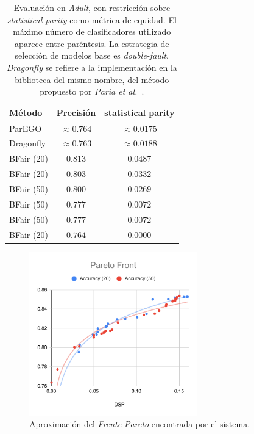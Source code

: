 \begin{table}[H]
    \centering

    \begin{tabular}{lcc}
    \toprule
        Método & Precisión & statistical parity \\
        \midrule \midrule
        ParEGO & $\approx 0.764$ & $\approx 0.0175$ \\
        Dragonfly & $\approx 0.763$ & $\approx 0.0188$ \\
        \midrule
        BFair (20) & $0.813$ & $0.0487$ \\  %
        BFair (20) & $0.803$ & $0.0332$ \\  %
        BFair (50) & $0.800$ & $0.0269$ \\  %
        BFair (50) & $0.777$ & $0.0072$ \\  %
        BFair (50) & $0.777$ & $0.0072$ \\  %
        BFair (20) & $0.764$ & $0.0000$ \\  %
        
    \bottomrule
    \end{tabular}

    \caption{
    Evaluación en \emph{Adult}, con restricción sobre \emph{statistical parity} como métrica de equidad.
    El máximo número de clasificadores utilizado aparece entre paréntesis.
    La estrategia de selección de modelos base es \emph{double-fault}.
    \emph{Dragonfly} se refiere a la implementación en la biblioteca del mismo nombre, del método propuesto por \emph{Paria et al.}~\parencite{paria2020flexible}.}
    \label{table:second-phase-vs-mobo}
\end{table}

\begin{figure}[h]
    \begin{center}
        \includegraphics[width=0.65\textwidth]{Graphics/pareto-front.pdf}
    \end{center}
    \caption{Aproximación del \emph{Frente Pareto} encontrada por el sistema.}
    \label{fig:pareto-dsp-vs-acc}
\end{figure}

